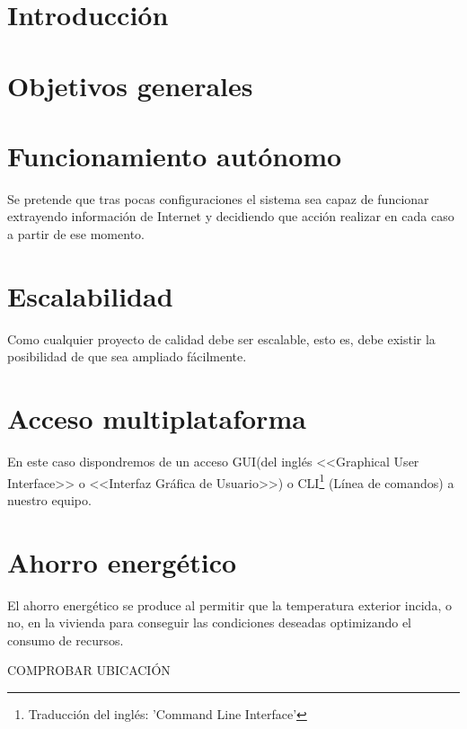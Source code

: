 
\section{Introducción}

\section{Objetivos generales}

\section{Funcionamiento autónomo}
Se pretende que tras pocas configuraciones el sistema sea capaz de funcionar extrayendo información de Internet y decidiendo que acción realizar en cada caso a partir de ese momento.

\section{Escalabilidad}
Como cualquier proyecto de calidad debe ser escalable, esto es, debe existir la posibilidad de que sea ampliado fácilmente.

\section{Acceso multiplataforma}
En este caso dispondremos de un acceso GUI(del inglés <<Graphical User Interface>> o <<Interfaz Gráfica de Usuario>>) o CLI\footnote{Traducción del inglés: 'Command Line Interface'} (Línea de comandos) a nuestro equipo.

\section{Ahorro energético}
El ahorro energético se produce al permitir que la temperatura exterior incida, o no, en la vivienda para conseguir las condiciones deseadas optimizando el consumo de recursos.

COMPROBAR UBICACIÓN
